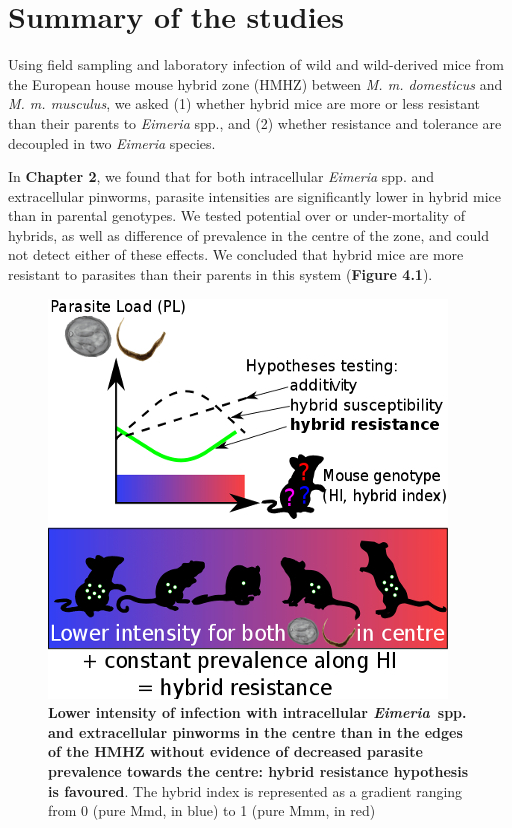 \section{Summary of the studies}
Using field sampling and laboratory infection of wild and wild-derived mice from the European house mouse hybrid zone (HMHZ) between \textit{M. m. domesticus} and \textit{M. m. musculus}, we asked (1) whether hybrid mice are more or less resistant than their parents to \textit{Eimeria} spp., and (2) whether resistance and tolerance are decoupled in two \textit{Eimeria} species. \par

In \textbf{Chapter 2}, we found that for both intracellular \textit{Eimeria} spp. and extracellular pinworms, parasite intensities are significantly lower in hybrid mice than in parental genotypes. We tested potential over or under-mortality of hybrids, as well as difference of prevalence in the centre of the zone, and could not detect either of these effects. We concluded that hybrid mice are more resistant to parasites than their parents in this system (\textbf{Figure 4.1}).

\begin{figure}[H]
    \centering
    \includegraphics[width=.5\linewidth,height=\textheight,keepaspectratio]{images/4discussion/Figure3.jpg}
    \caption{\textbf{Lower intensity of infection with intracellular \textit{Eimeria}~spp. and extracellular pinworms in the centre than in the edges of the HMHZ without evidence of decreased parasite prevalence towards the centre: hybrid resistance hypothesis is favoured}. The hybrid index is represented as a gradient ranging from 0 (pure Mmd, in blue) to 1 (pure Mmm, in red)}
\end{figure}

